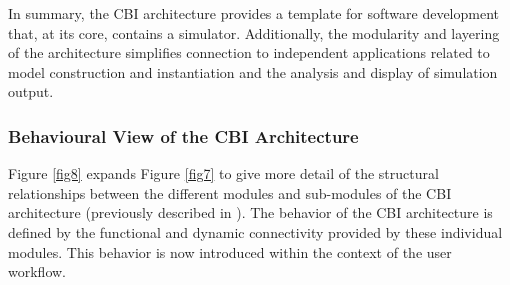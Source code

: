 \documentclass[10pt,letterpaper]{article}
\begin{document}

In summary, the CBI architecture provides a template for software development that, at its core, contains a simulator.  Additionally, the modularity and layering of the architecture simplifies connection to independent applications related to model construction and instantiation and the analysis and display of simulation output.

\subsubsection*{Behavioural View of the CBI Architecture}

Figure \ref{fig8} expands Figure \ref{fig7} to give more detail of the structural relationships between the different modules and sub-modules of the CBI architecture (previously described in \cite{cornelis12}). The behavior of the CBI architecture is defined by the functional and dynamic connectivity provided by these individual modules. This behavior is now introduced within the context of the user workflow.
\end{document}
